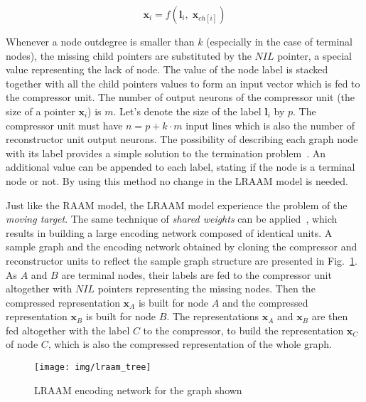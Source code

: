 \begin{equation}
\bm{x}_i = f(\bm{l}_i, \; \bm{x}_{ch[i]})
\label{eq:lraam_pointer}
\end{equation}

Whenever a node outdegree is smaller than $k$ (especially in the case of terminal nodes), the missing child pointers are substituted by the $NIL$ pointer, a special value representing the lack of node. The value of the node label is stacked together with all the child pointers values to form an input vector which is fed to the compressor unit. The number of output neurons of the compressor unit (the size of a pointer $\bm{x}_i$) is $m$. Let's denote the size of the label $\bm{l}_i$ by $p$. The compressor unit must have $n = p + k \cdot m$ input lines which is also the number of reconstructor unit output neurons. The possibility of describing each graph node with its label provides a simple solution to the termination problem~\cite{sperduti1994labelling}. An additional value can be appended to each label, stating if the node is a terminal node or not. By using this method no change in the LRAAM model is needed.

Just like the RAAM model, the LRAAM model experience the problem of the \emph{moving target}. The same technique of \emph{shared weights} can be applied~\cite{goulon2005hopfield}, which results in building a large encoding network composed of identical units. A sample graph and the encoding network obtained by cloning the compressor and reconstructor units to reflect the sample graph structure are presented in Fig.~\ref{fig:lraam_tree}. As $A$ and $B$ are terminal nodes, their labels are fed to the compressor unit altogether with $NIL$ pointers representing the missing nodes. Then the compressed representation $\bm{x}_{A}$ is built for node $A$ and the compressed representation $\bm{x}_{B}$ is built for node $B$. The representations $\bm{x}_A$ and $\bm{x}_B$ are then fed altogether with the label $C$ to the compressor, to build the representation $\bm{x}_C$ of node $C$, which is also the compressed representation of the whole graph.

\begin{figure}
\begin{center}
	\texttt{[image: img/lraam\_tree]}
	\caption{LRAAM encoding network for the graph shown}
	\label{fig:lraam_tree}
\end{center}
\end{figure}

